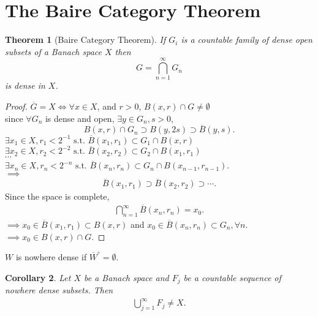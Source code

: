 \documentclass[a4paper]{book}
\newtheorem{thm}{Theorem}[chapter]
\newtheorem{coro}[thm]{Corollary}
{
    \theoremstyle{nonumberplain}
    \theoremheaderfont{\normalfont}
    \theorembodyfont{\normalfont}
    \theoremsymbol{\mbox{$\Box$}}
    \newtheorem{proof}{proof}
}
{
    \theoremstyle{nonumberplain}
    \newtheorem{myDef}{Definition}
}
\begin{document}
\section{The Baire Category Theorem}
\begin{thm}[Baire Category Theorem]
    If $G_i$ is a countable family of dense open subsets of a Banach space $X$ then
    \begin{equation*}
        G = \bigcap_{n=1}^\infty G_n
    \end{equation*}
    is dense in $X$.
\end{thm}
\begin{proof}
    $\overline G = X \iff \forall x \in X$, and $r>0$, $B(x,r) \cap G \neq \emptyset$\\
    since $\forall G_n$ is dense and open, $\exists y \in G_n, s>0$,
    \begin{equation*}
        B(x,r)\cap G_n \supset B(y,2s) \supset \overline{B}(y,s).
    \end{equation*}
    $\exists x_1 \in X, r_1 < 2^{-1} \text{ s.t. } \overline{B}(x_1,r_1) \subset G_1 \cap B(x,r)$\\
    $\exists x_2 \in X, r_2 < 2^{-2} \text{ s.t. } \overline{B}(x_2,r_2) \subset G_2 \cap B(x_1,r_1)$\\
    $\cdots$\\
    $\exists x_n \in X, r_n < 2^{-n} \text{ s.t. } \overline{B}(x_n,r_n) \subset G_n \cap B(x_{n-1},r_{n-1})$.\\
    $\implies$
    \begin{gather}
        \overline{B}(x_1,r_1) \supset \overline{B}(x_2,r_2) \supset \cdots .
    \end{gather}
    Since the space is complete,
    \begin{gather*}
        \bigcap_{n=1}^\infty \overline{B}(x_n,r_n)=x_0.
    \end{gather*}
    $\implies x_0 \in \overline{B}(x_1,r_1) \subset B(x,r)$ and $x_0 \in \overline{B}(x_n,r_n) \subset G_n, \forall n. $\\
    $\implies x_0 \in B(x,r) \cap G$.
\end{proof}
\begin{myDef}
    $W$ is nowhere dense if $\overline{W}^\circ = \emptyset$.
\end{myDef}
\begin{coro}\label{Baire Category thm coro}
    Let $X$ be a Banach space and $F_j$ be a countable sequence of nowhere dense subsets. Then
    \begin{gather*}
        \bigcup_{j=1}^\infty F_j \neq X.
    \end{gather*}
\end{coro}
\end{document}
